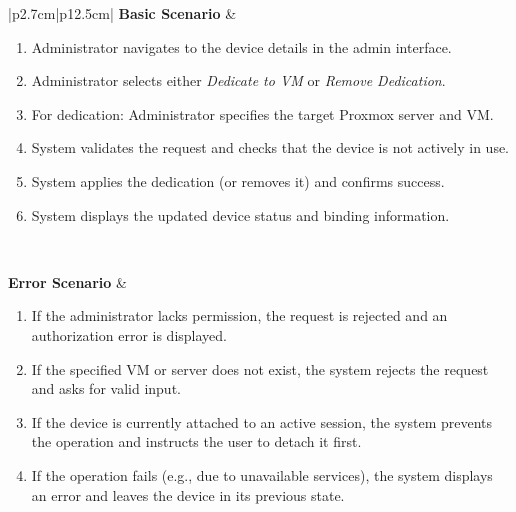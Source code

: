 \begin{table}[H]
\begin{tabular}{|p{2.7cm}|p{12.5cm}|}
        \textbf{Basic Scenario} & \begin{minipage}[t]{\linewidth}
                                      \begin{enumerate}[topsep=0pt,itemsep=1pt,parsep=0pt,partopsep=0pt]
                                          \item Administrator navigates to the device details in the admin interface.
                                          \item Administrator selects either \textit{Dedicate to VM} or \textit{Remove Dedication}.
                                          \item For dedication: Administrator specifies the target Proxmox server and VM.
                                          \item System validates the request and checks that the device is not actively in use.
                                          \item System applies the dedication (or removes it) and confirms success.
                                          \item System displays the updated device status and binding information.
                                      \end{enumerate}
                                  \end{minipage} \\ \hline
        
        \textbf{Error Scenario} & \begin{minipage}[t]{\linewidth}
                                      \begin{enumerate}[topsep=0pt,itemsep=1pt,parsep=0pt,partopsep=0pt]
                                          \item If the administrator lacks permission, the request is rejected and an authorization error is displayed.
                                          \item If the specified VM or server does not exist, the system rejects the request and asks for valid input.
                                          \item If the device is currently attached to an active session, the system prevents the operation and instructs the user to detach it first.
                                          \item If the operation fails (e.g., due to unavailable services), the system displays an error and leaves the device in its previous state.
                                      \end{enumerate}
                                  \end{minipage} \\ \hline
    \end{tabular}
    \label{tab:admin-dedicate-remove-device}
\end{table}

